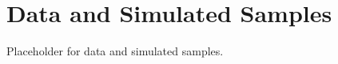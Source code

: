 \chapter{Data and Simulated Samples}
\label{ch:samples}

Placeholder for data and simulated samples.
